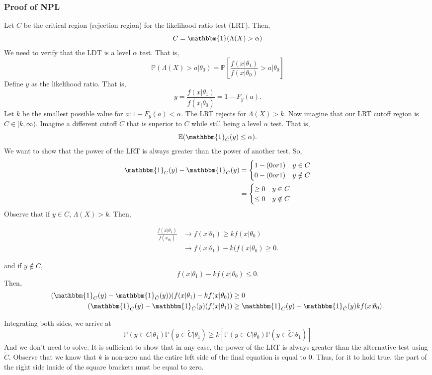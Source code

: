 \documentclass[titlepage, 12pt, leqno]{article}
\begin{document}
\subsubsection{Proof of NPL}
Let $C$  be the critical region (rejection region) for the likelihood ratio
test (LRT). Then,
\[
C = \mathbbm{1}(\Lambda(X) > \alpha)
\]
We need to verify that the LDT is a level $\alpha$ test. That is,
\[
\mathbb{P}(\Lambda(X) > a | \theta_{0}) = 
\mathbb{P}\left[\frac{f(x|\theta_{1})}{f(x|\theta_{0})} > a | \theta_{0}
\right]
\]
Define $y$ as the likelihood ratio. That is,
\[
y = \frac{f(x|\theta_{1})}{f(x_|\theta_{0})} = 1 - F_{y}(a).
\]
Let $k$ be the smallest possible value for $a:1-F_{y}(a) < \alpha$. The LRT
rejects for $\Lambda(X)>k$. Now imagine that our LRT cutoff region is
$C \in [k, \infty)$. Imagine a different cutoff $\tilde{C}$ that is superior
to $C$ while still being a level $\alpha$ test. That is,
\[
\mathbb{E}(\mathbbm{1}_{\tilde{C}}(y)\le \alpha).
\]
We want to show that the power of the LRT is always greater than the power of
another test. So,
\begin{align*}
    \mathbbm{1}_{C}(y) - \mathbbm{1}_{\tilde{C}}(y)
    &=
    \begin{cases}
        1 - (0 or 1) & y \in C \\
        0 - (0 or 1) & y \notin C
    \end{cases}
    \\
    &=
    \begin{cases}
        \ge 0 & y \in C \\
        \le 0  & y \notin C
    \end{cases}
\end{align*}
Observe that if $y \in C$, $\Lambda(X)>k$. Then,

\begin{align*}
    \frac{f(x|\theta_{1})}{f(x_{\theta_{0}})}
    & \rightarrow f(x|\theta_{1}) \ge kf(x|\theta_{0}) \\
    & \rightarrow f(x|\theta_{1}) - k(f(x | \theta_{0}) \ge 0.
\end{align*}

and if $y \notin C$,
\[
f(x|\theta_{1}) - kf(x|\theta_{0}) \le 0.
\]
Then,
\begin{align*}
    (\mathbbm{1}_{C}(y) - \mathbbm{1}_{\tilde{C}}(y))
    (f(x|\theta_{1}) - kf(x|\theta_{0})) 
    &\ge 0 \\
    (\mathbbm{1}_{C}(y) - \mathbbm{1}_{\tilde{C}}(y)(f(x|\theta_{1}))
    &\ge \mathbbm{1}_{C}(y) - \mathbbm{1}_{\tilde{C}}(y) kf(x|\theta_{0}).
\end{align*}

Integrating both sides, we arrive at
\[
    \mathbb{P}(y \in C | \theta_{1}) \mathbb{P}(y \in \tilde{C}|\theta_{1})
    \ge k\left[\mathbb{P}(y \in C | \theta_{0}) \mathbb{P}(y \in \tilde{C}
    | \theta_{1})\right]
\]
And we don't need to solve. It is sufficient to show that in any case,
the power of the LRT is always greater than the alternative test using 
$\tilde{C}$. Observe that we know that $k$ is non-zero and the entire left side
of the final equation is equal to 0. Thus, for it to hold true, the 
part of the right side inside of the square brackets must be equal to zero.
\end{document}
